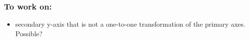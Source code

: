 \documentclass[]{article}
\providecommand{\tightlist}{%
  \setlength{\itemsep}{0pt}\setlength{\parskip}{0pt}}
\begin{document}
\subsubsection{To work on:}\label{to-work-on}

\begin{itemize}
\tightlist
\item
  secondary y-axis that is not a one-to-one transformation of the
  primary axes. Possible?
\end{itemize}
\end{document}

